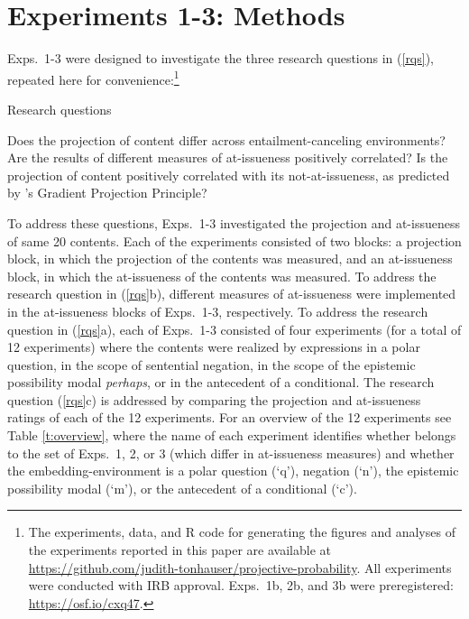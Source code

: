 \documentclass[11pt,fleqn]{article}
\newcommand{\6}{\mbox{$[\hspace*{-.6mm}[$}}
\newcommand{\9}{\mbox{$]\hspace*{-.6mm}]$}}
\newcommand{\citepos}[1]{\citeauthor{#1}'s \citeyear{#1}}
\begin{document}
\newpage

\section{Experiments 1-3: Methods}\label{s2}

Exps.~1-3 were designed to investigate the three research questions in (\ref{rqs}), repeated here for convenience:\footnote{\label{f-github}The experiments, data, and R code for generating the figures and analyses of the experiments reported in this paper are available at \url{https://github.com/judith-tonhauser/projective-probability}. All experiments were conducted with IRB approval. Exps.~1b, 2b, and 3b were preregistered: \url{https://osf.io/cxq47}.} 

\begin{exe}
\ex\label{rqs} Research questions
\begin{xlist}
\ex Does the projection of content differ across entailment-canceling environments?
\ex Are the results of different measures of at-issueness positively correlated?
\ex Is the projection of content positively correlated with its not-at-issueness, as predicted by \citepos{tbd-variability} Gradient Projection Principle?
\end{xlist}
\end{exe}
To address these questions, Exps.~1-3 investigated the projection and at-issueness of same 20 contents. Each of the experiments consisted of two blocks: a projection block, in which the projection of the contents was measured, and an at-issueness block, in which the at-issueness of the contents was measured. To address the research question in (\ref{rqs}b), different measures of at-issueness were implemented in the at-issueness blocks of Exps.~1-3, respectively. To address the research question in (\ref{rqs}a), each of Exps.~1-3 consisted of four experiments (for a total of 12 experiments) where the contents were realized by expressions in a polar question, in the scope of sentential negation, in the scope of the epistemic possibility modal {\em perhaps}, or in the antecedent of a conditional. The research question (\ref{rqs}c) is addressed by comparing the projection and at-issueness ratings of each of the 12 experiments. For an overview of the 12 experiments see Table \ref{t:overview}, where the name of each experiment identifies whether belongs to the set of Exps.~1, 2, or 3 (which differ in at-issueness measures) and whether the embedding-environment is a polar question (`q'), negation (`n'), the epistemic possibility modal (`m'), or the antecedent of a conditional (`c').
\end{document}
